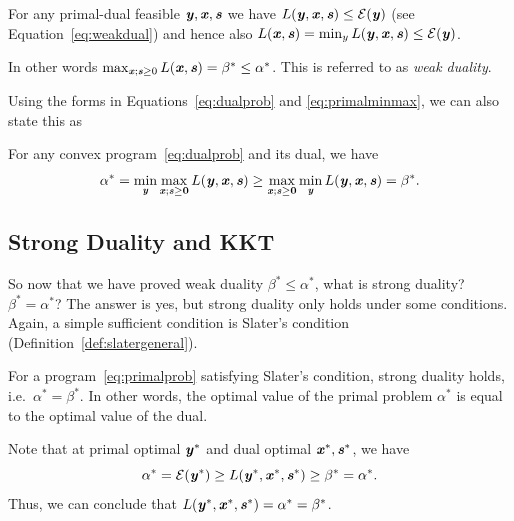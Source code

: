 {%


For any primal-dual feasible $\yy,\xx,\ss$ we have
$L(\yy, \xx, \ss) \leq \energy(\yy)$ (see Equation~\eqref{eq:weakdual}) and hence also $L(\xx, \ss) = \min_y L(\yy, \xx, \ss) \leq \energy(\yy)$.

In other words $\max_{\xx; \ss \geq 0} L(\xx, \ss) = \beta^* \leq \alpha^*$.
This is referred to as \emph{weak duality}.

Using the forms in Equations~\eqref{eq:dualprob} and
\eqref{eq:primalminmax}, we can also state this as
\begin{theorem}
  For any convex program~\eqref{eq:dualprob} and its dual, we have
  \begin{equation*}
  \alpha^* = \min_{\yy}\max_{\xx; \ss\geq\veczero} L(\yy, \xx, \ss)
  \geq
  \max_{\xx; \ss\geq\veczero} \min_{\yy} L(\yy, \xx, \ss)
  =
  \beta^*
  .
\end{equation*}
\end{theorem}


\subsection{Strong Duality and KKT}
So now that we have proved weak duality $\beta^* \leq \alpha^*$,
what is strong duality? $\beta^* = \alpha^*$?
The answer is yes, but strong duality only holds under some conditions.
Again, a simple sufficient condition is Slater's condition (Definition~\ref{def:slatergeneral}).

\begin{theorem}
  \label{thm:slaterstrongduality}
For a program~\eqref{eq:primalprob} satisfying Slater's condition, strong duality holds, i.e.\ $\alpha^* = \beta^*$.
In other words, the optimal value of the primal problem $\alpha^*$ is
equal to the optimal value of the dual.
\end{theorem}

Note that at primal optimal $\yy^*$ and dual optimal $\xx^*,
\ss^*$, we have
\[
  \alpha^* = \energy(\yy^*) \geq L(\yy^*, \xx^*, \ss^*)
  \geq \beta^* = \alpha^*
  .
\]
Thus, we can conclude that $L(\yy^*, \xx^*, \ss^*) = \alpha^* =
\beta^*$.

}
